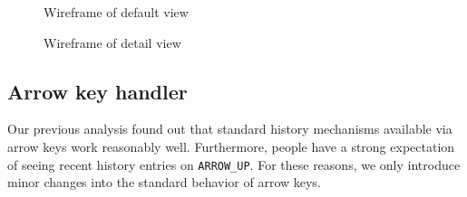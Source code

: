 \begin{figure}[h!]
\caption{Wireframe of default view}
\label{wireframe-normal}
\end{figure}

\begin{figure}[h!]
\caption{Wireframe of detail view}
\label{wireframe-detail}
\end{figure}


\subsection{Arrow key handler}

Our previous analysis found out that standard history mechanisms available via arrow keys work reasonably well. Furthermore, people have a strong expectation of seeing recent history entries on \verb|ARROW_UP|. 
For these reasons, we only introduce minor changes into the standard behavior of arrow keys.


